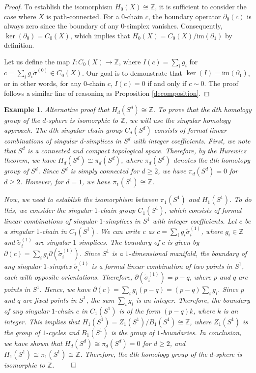 \documentclass{amsart}
\newtheorem{example}[definition]{Example}
\begin{document}
\begin{proof}
To establish the isomorphism $H_0(X) \cong \mathbb{Z}$, it is sufficient to consider the case where $X$ is path-connected. For a $0$-chain $c$, the boundary operator $\partial_0(c)$ is always zero since the boundary of any $0$-simplex vanishes. Consequently, $\ker(\partial_0) = C_0(X)$, which implies that $H_0(X) = C_0(X) / \text{im}(\partial_1)$ by definition.

Let us define the map $I: C_0(X) \rightarrow \mathbb{Z}$, where $I(c) = \sum_i g_i$ for $c = \sum_i g_i \tilde{\sigma}^{(0)} \in C_0(X)$. Our goal is to demonstrate that $\ker(I) = \text{im}(\partial_1)$, or in other words, for any $0$-chain $c$, $I(c) = 0$ if and only if $c \sim 0$. The proof follows a similar line of reasoning as Proposition \ref{decomposition}.
\end{proof}

\begin{example}
Alternative proof that $H_d(S^d) \cong \mathbb{Z}$. To prove that the $d$th homology group of the $d$-sphere is isomorphic to $\mathbb{Z}$, we will use the singular homology approach. The $d$th singular chain group $C_d(S^d)$ consists of formal linear combinations of singular $d$-simplices in $S^d$ with integer coefficients. First, we note that $S^d$ is a connected and compact topological space. Therefore, by the Hurewicz theorem, we have $H_d(S^d) \cong \pi_d(S^d)$, where $\pi_d(S^d)$ denotes the $d$th homotopy group of $S^d$. Since $S^d$ is simply connected for $d \geq 2$, we have $\pi_d(S^d) = 0$ for $d \geq 2$. However, for $d = 1$, we have $\pi_1(S^1) \cong \mathbb{Z}$.

Now, we need to establish the isomorphism between $\pi_1(S^1)$ and $H_1(S^1)$. To do this, we consider the singular $1$-chain group $C_1(S^1)$, which consists of formal linear combinations of singular $1$-simplices in $S^1$ with integer coefficients. Let $c$ be a singular $1$-chain in $C_1(S^1)$. We can write $c$ as $c = \sum_{i} g_i \tilde{\sigma}^{(1)}_i$, where $g_i \in \mathbb{Z}$ and $\tilde{\sigma}^{(1)}_i$ are singular $1$-simplices. The boundary of $c$ is given by $\partial(c) = \sum_{i} g_i \partial(\tilde{\sigma}^{(1)}_i)$. Since $S^1$ is a $1$-dimensional manifold, the boundary of any singular $1$-simplex $\tilde{\sigma}^{(1)}_i$ is a formal linear combination of two points in $S^1$, each with opposite orientations. Therefore, $\partial(\tilde{\sigma}^{(1)}_i) = p - q$, where $p$ and $q$ are points in $S^1$. Hence, we have $\partial(c) = \sum_{i} g_i (p - q) = (p - q) \sum_{i} g_i$. Since $p$ and $q$ are fixed points in $S^1$, the sum $\sum_{i} g_i$ is an integer. Therefore, the boundary of any singular $1$-chain $c$ in $C_1(S^1)$ is of the form $(p - q)k$, where $k$ is an integer. This implies that $H_1(S^1) = Z_1(S^1) / B_1(S^1) \cong \mathbb{Z}$, where $Z_1(S^1)$ is the group of $1$-cycles and $B_1(S^1)$ is the group of $1$-boundaries. In conclusion, we have shown that $H_d(S^d) \cong \pi_d(S^d) = 0$ for $d \geq 2$, and $H_1(S^1) \cong \pi_1(S^1) \cong \mathbb{Z}$. Therefore, the $d$th homology group of the $d$-sphere is isomorphic to $\mathbb{Z}$. $\qed$
\end{example}
\end{document}
